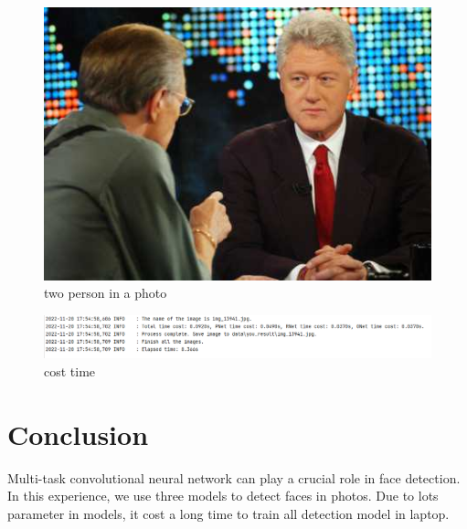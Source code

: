 \documentclass[journal, a4paper]{IEEEtran}
\begin{document}
	\begin{figure}
		\begin{center}
		\includegraphics[width=\columnwidth]{images/img_13869.jpg}
		\caption{two person in a photo}
		\label{fig:13869_raw}
		\end{center}
	\end{figure}
	\begin{figure}
		\begin{center}
		\includegraphics[width=\columnwidth]{images/cost.png}
		\caption{cost time}
		\label{fig:cost}
		\end{center}
	\end{figure}

\section{Conclusion}
	Multi-task convolutional neural network can play a crucial role in face detection. In this experience, we use three models to detect faces in photos. Due to lots parameter in models, it cost a long time to train all detection model in laptop. 
 
\end{document}
